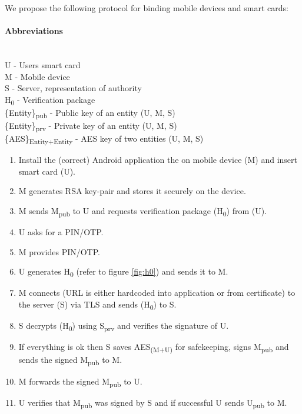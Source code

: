 We propose the following protocol for binding mobile devices and smart cards:

\paragraph{Abbreviations}\mbox{}\\
U - Users smart card \\
M - Mobile device \\
S - Server, representation of authority \\
H\textsubscript{0} - Verification package \\
\{Entity\}\textsubscript{pub} - Public key of an entity (U, M, S)\\
\{Entity\}\textsubscript{prv} - Private key of an entity (U, M, S)\\
\{AES\}\textsubscript{Entity+Entity} - AES key of two entities (U, M, S)\\


\begin{enumerate}
  \item Install the (correct) Android application the on mobile device (M) and insert smart card (U).
  \item M generates RSA key-pair and stores it securely on the device.
  \item M sends M\textsubscript{pub} to U and requests verification package (H\textsubscript{0}) from (U).
  \item U asks for a PIN/OTP.
  \item M provides PIN/OTP.
  \item U generates H\textsubscript{0} (refer to figure \ref{fig:h0}) and sends it to M.
  \item M connects (URL is either hardcoded into application or from certificate) to the server (S) via TLS and sends (H\textsubscript{0}) to S.
  \item S decrypts (H\textsubscript{0}) using S\textsubscript{prv} and verifies the signature of U.
  \item If everything is ok then S saves AES\textsubscript{(M+U)} for safekeeping, signs M\textsubscript{pub} and sends the signed  M\textsubscript{pub} to M.
  \item M forwards the signed M\textsubscript{pub} to U.
  \item U verifies that M\textsubscript{pub} was signed by S and if successful U sends U\textsubscript{pub} to M.
\end{enumerate}

